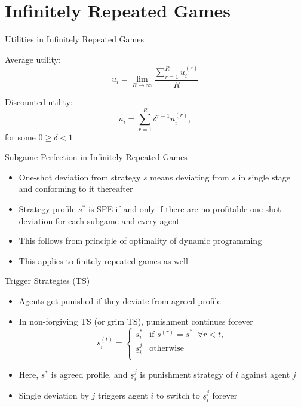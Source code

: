 \documentclass[11pt,aspectratio=169,handout]{beamer}
\begin{document}
 \section{Infinitely Repeated Games}
 
  \begin{frame}{Utilities in Infinitely Repeated Games}
   \begin{itemizes}[2em]
    \item \alert{Average utility}: 
    $$u_i = \lim_{R\rightarrow\infty}\frac{\sum_{r=1}^{R}u_i^{(r)}}{R}$$
    \item \alert{Discounted utility}: 
    $$u_i = \sum_{r=1}^{R}\delta^{r-1} u_i^{(r)},$$
    for some $0 \ge \delta < 1$
   \end{itemizes}
  \end{frame}
  
  
  \begin{frame}{Subgame Perfection in Infinitely Repeated Games}
   \begin{itemize}
   \setlength{\itemsep}{2em}
    \item \alert{One-shot deviation} from strategy $s$ means deviating from $s$ in single stage and conforming to it thereafter
    \item Strategy profile $s^*$ is SPE \alert{if and only if} there are no \alert{profitable} one-shot deviation for \alert{each subgame} and \alert{every agent}
    \item This follows from principle of optimality of \alert{dynamic programming}
    \item This applies to finitely repeated games as well
   \end{itemize}
  \end{frame}

  \begin{frame}{Trigger Strategies (TS)}
   \begin{itemize}
    \item Agents get \alert{punished} if they deviate from agreed profile
    \item In \alert{non-forgiving} TS (or grim TS), punishment continues forever
    $$ 
    s_i^{(t)}=\begin{cases}
                  s_i^* &\text{if } s^{(r)} = s^* \;\; \forall r<t,\\
                  \underline{s}_{i}^{j} &\text{otherwise}\\
                 \end{cases}
    $$
    \item Here, $s^{*}$ is agreed profile, and $\underline{s}_{i}^{j}$ is punishment strategy of $i$ against agent $j$
    \item Single deviation by $j$ triggers agent $i$ to switch to $\underline{s}_{i}^{j}$ \alert{forever}
   \end{itemize}
  \end{frame}
\end{document}
